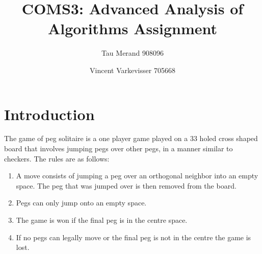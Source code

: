 \documentclass[12pt,a4paper]{report}
\begin{document}
\parindent0pt

\title{COMS3: Advanced Analysis of Algorithms Assignment}
\author{Tau Merand 908096 \and Vincent Varkevisser 705668}
\maketitle
\section*{Introduction}
The game of peg solitaire is a one player game played on a 33 holed cross shaped board that involves jumping pegs over other pegs, in a manner similar to checkers. The rules are as follows:
\begin{enumerate}
  \item A move consists of jumping a peg over an orthogonal neighbor into an empty space. The peg that was jumped over is then removed from the board.
  \item Pegs can only jump onto an empty space.
  \item The game is won if the final peg is in the centre space.
  \item If no pegs can legally move or the final peg is not in the centre the game is lost.
\end{enumerate}
\end{document}
